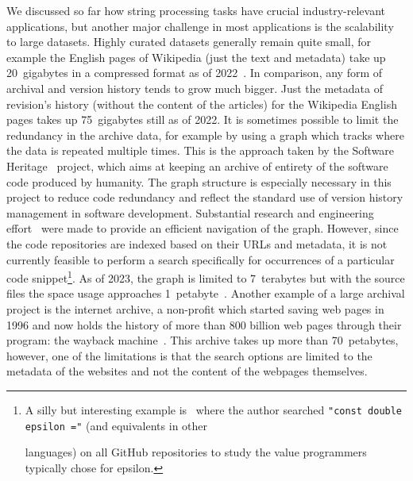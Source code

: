 We discussed so far how string processing tasks have crucial industry-relevant applications, but another major challenge in most applications is the scalability to large datasets.
Highly curated datasets generally remain quite small, for example the English pages of Wikipedia (just the text and metadata) take up 20~gigabytes in a compressed format as of 2022~\cite{wikimedia}. In comparison, any form of archival and version history tends to grow much bigger. Just the metadata of revision's history (without the content of the articles) for the Wikipedia English pages takes up 75~gigabytes still as of 2022.
It is sometimes possible to limit the redundancy in the archive data, for example by using a graph which tracks where the data is repeated multiple times. This is the approach taken by the Software Heritage~\cite{swh-site} project, which aims at keeping an archive of entirety of the software code produced by humanity. The graph structure is especially necessary in this project to reduce code redundancy and reflect the standard use of version history management in software development.
Substantial research and engineering effort~\cite{DBLP:phd/hal/Pietri21} were made to provide an efficient navigation of the graph. 
However, since the code repositories are indexed based on their URLs and metadata, it is not currently feasible to perform a search specifically for occurrences of a particular code snippet\footnote{\setlength\parindent{10pt} A silly but interesting example is~\cite{vii2014if} where the author searched \texttt{"const double epsilon ="} (and equivalents in other \par languages) on all GitHub repositories to study the value programmers typically chose for epsilon.}.
As of 2023, the graph is limited to 7~terabytes but with the source files the space usage approaches 1~petabyte~\cite{swh-polytechnique}.
Another example of a large archival project is the internet archive, a non-profit which started saving web pages in 1996 and now holds the history of more than 800 billion web pages through their program: the wayback machine~\cite{web-archive}. This archive takes up more than 70~petabytes, however, one of the limitations is that the search options are limited to the metadata of the websites and not the content of the webpages themselves.


